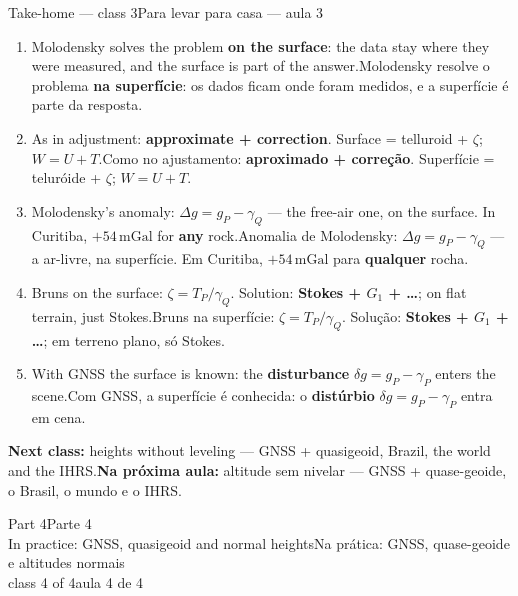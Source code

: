 \documentclass[aspectratio=169,11pt]{beamer}
\newcommand{\tr}[2]{\ifEN#2\else#1\fi}
\newcommand{\bnum}[1]{\textbf{\textcolor{mTeal}{#1}}}
\newcommand{\mGal}{\ensuremath{\,\mathrm{mGal}}\xspace}
\begin{document}
\begin{frame}{\tr{Para levar para casa --- aula 3}{Take-home --- class 3}}
  \small
  \begin{enumerate}
    \setlength{\itemsep}{2pt}
    \item \tr{Molodensky resolve o problema \bnum{na superfície}: os dados ficam onde foram
          medidos, e a superfície é parte da resposta.}{Molodensky solves the problem \bnum{on
          the surface}: the data stay where they were measured, and the surface is part of
          the answer.}
    \item \tr{Como no ajustamento: \bnum{aproximado + correção}. Superfície = teluróide +
          $\zeta$; $W = U + T$.}{As in adjustment: \bnum{approximate + correction}. Surface =
          telluroid + $\zeta$; $W = U + T$.}
    \item \tr{Anomalia de Molodensky: $\Delta g = g_P - \gamma_Q$ --- a ar-livre, na superfície.
          Em Curitiba, $+54$\mGal para \bnum{qualquer} rocha.}{Molodensky's anomaly: $\Delta g
          = g_P - \gamma_Q$ --- the free-air one, on the surface. In Curitiba, $+54$\mGal for
          \bnum{any} rock.}
    \item \tr{Bruns na superfície: $\zeta = T_P/\gamma_Q$. Solução: \bnum{Stokes + $G_1$ +
          \ldots}; em terreno plano, só Stokes.}{Bruns on the surface: $\zeta =
          T_P/\gamma_Q$. Solution: \bnum{Stokes + $G_1$ + \ldots}; on flat terrain, just
          Stokes.}
    \item \tr{Com GNSS, a superfície é conhecida: o \bnum{distúrbio} $\delta g = g_P -
          \gamma_P$ entra em cena.}{With GNSS the surface is known: the \bnum{disturbance}
          $\delta g = g_P - \gamma_P$ enters the scene.}
  \end{enumerate}
  \begin{ideia}
    \scriptsize \tr{\textbf{Na próxima aula:} altitude sem nivelar --- GNSS + quase-geoide, o
    Brasil, o mundo e o IHRS.}{\textbf{Next class:} heights without leveling --- GNSS +
    quasigeoid, Brazil, the world and the IHRS.}
  \end{ideia}
\end{frame}

\begin{frame}[standout]
  \tr{Parte 4}{Part 4}\\[6pt]
  {\normalsize \tr{Na prática: GNSS, quase-geoide e altitudes normais}{In practice: GNSS,
  quasigeoid and normal heights}}\\[4pt]
  {\scriptsize \tr{aula 4 de 4}{class 4 of 4}}
\end{frame}
\end{document}
